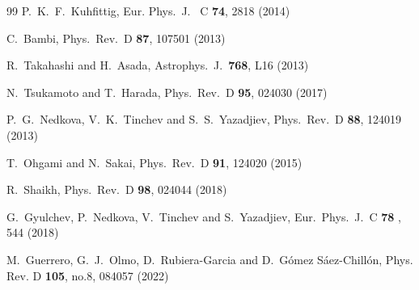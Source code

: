 \documentclass[twocolumn,showpacs,preprintnumbers,amsmath,amssymb,floatfix]{revtex4-1}
\begin{document}
\begin{thebibliography}{99}
  P.~K.~F.~Kuhfittig,
  Eur. Phys.\ J. \ C {\bf 74},  2818 (2014)
 
  C.~Bambi,
  Phys.\ Rev.\ D {\bf 87}, 107501 (2013)

  R.~Takahashi and H.~Asada,
  Astrophys.\ J.\  {\bf 768}, L16 (2013)

  N.~Tsukamoto and T.~Harada,
  Phys.\ Rev.\ D {\bf 95},   024030 (2017)

  P.~G.~Nedkova, V.~K.~Tinchev and S.~S.~Yazadjiev,
  Phys.\ Rev.\ D {\bf 88},   124019 (2013)

  T.~Ohgami and N.~Sakai,
  Phys.\ Rev.\ D {\bf 91}, 124020 (2015)

  R.~Shaikh,
  Phys.\ Rev.\ D {\bf 98},  024044 (2018)

  G.~Gyulchev, P.~Nedkova, V.~Tinchev and S.~Yazadjiev,
  Eur.\ Phys.\ J.\ C {\bf 78} ,  544 (2018)

M.~Guerrero, G.~J.~Olmo, D.~Rubiera-Garcia and D.~G\'omez S\'aez-Chill\'on,
Phys. Rev. D \textbf{105}, no.8, 084057 (2022)


\end{thebibliography}
\end{document}
